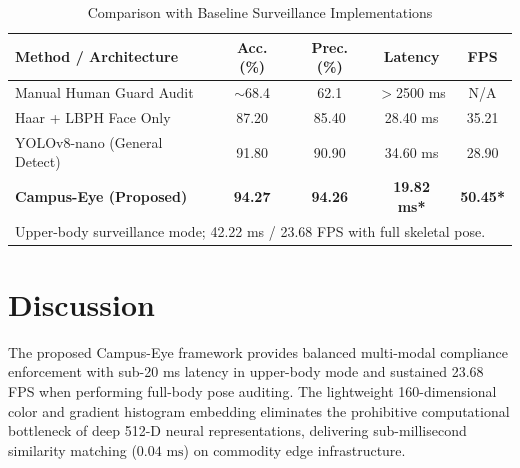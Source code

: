 \documentclass[conference]{IEEEtran}
\begin{document}
\begin{table}[htbp]
\centering
\caption{Comparison with Baseline Surveillance Implementations}
\label{tab:baseline_comparison}
\begin{tabular}{lcccc}
\toprule
\textbf{Method / Architecture} & \textbf{Acc. (\%)} & \textbf{Prec. (\%)} & \textbf{Latency} & \textbf{FPS} \\
\midrule
Manual Human Guard Audit       & $\sim$68.4 & 62.1 & $>$2500 ms & N/A \\
Haar + LBPH Face Only          & 87.20      & 85.40 & 28.40 ms  & 35.21 \\
YOLOv8-nano (General Detect)   & 91.80      & 90.90 & 34.60 ms  & 28.90 \\
\textbf{Campus-Eye (Proposed)} & \textbf{94.27} & \textbf{94.26} & \textbf{19.82 ms*} & \textbf{50.45*} \\
\bottomrule
\multicolumn{5}{l}{\footnotesize *Upper-body surveillance mode; 42.22 ms / 23.68 FPS with full skeletal pose.}
\end{tabular}
\end{table}

\section{Discussion}
The proposed Campus-Eye framework provides balanced multi-modal compliance enforcement with sub-20 ms latency in upper-body mode and sustained 23.68 FPS when performing full-body pose auditing. The lightweight 160-dimensional color and gradient histogram embedding eliminates the prohibitive computational bottleneck of deep 512-D neural representations, delivering sub-millisecond similarity matching ($0.04\text{ ms}$) on commodity edge infrastructure.
\end{document}
